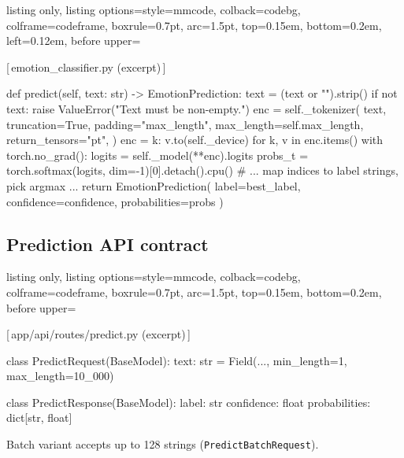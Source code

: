 \documentclass[11pt,a4paper]{article}
\newcommand{\CodeFilename}[1]{\vspace{-0.25em}\begin{center}\scriptsize\color{MMnavyL!80!black}\textsf{[\,#1\,]}\end{center}\vspace{-0.2em}}
\begin{document}
\begin{tcblisting}{listing only, listing options={style=mmcode},
  colback=codebg, colframe=codeframe, boxrule=0.7pt, arc=1.5pt, top=0.15em, bottom=0.2em, left=0.12em,
  before upper={\CodeFilename{emotion\_classifier.py (excerpt)}}
}
def predict(self, text: str) -> EmotionPrediction:
    text = (text or "").strip()
    if not text:
        raise ValueError("Text must be non-empty.")
    enc = self._tokenizer(
        text, truncation=True, padding="max_length",
        max_length=self.max_length, return_tensors="pt",
    )
    enc = {k: v.to(self._device) for k, v in enc.items()}
    with torch.no_grad():
        logits = self._model(**enc).logits
        probs_t = torch.softmax(logits, dim=-1)[0].detach().cpu()
    # ... map indices to label strings, pick argmax ...
    return EmotionPrediction(
        label=best_label, confidence=confidence, probabilities=probs
    )
\end{tcblisting}

\subsection{Prediction API contract}
\begin{tcblisting}{listing only, listing options={style=mmcode},
  colback=codebg, colframe=codeframe, boxrule=0.7pt, arc=1.5pt, top=0.15em, bottom=0.2em,
  before upper={\CodeFilename{app/api/routes/predict.py (excerpt)}}
}
class PredictRequest(BaseModel):
    text: str = Field(..., min_length=1, max_length=10_000)

class PredictResponse(BaseModel):
    label: str
    confidence: float
    probabilities: dict[str, float]
\end{tcblisting}
Batch variant accepts up to 128 strings (\texttt{PredictBatchRequest}).
\end{document}
